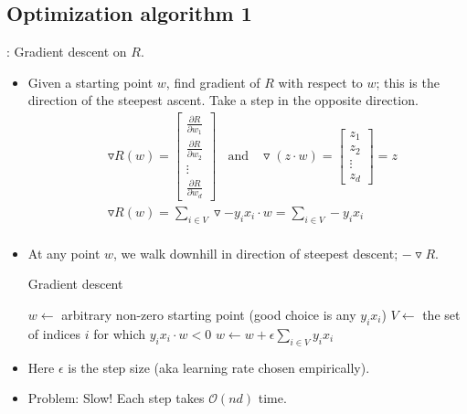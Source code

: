 \documentclass[10pt]{article}
\begin{document}
	\subsection{Optimization algorithm 1}: Gradient descent on $R$.
		\begin{itemize}
			\item Given a starting point $w$, find gradient of $R$ with respect to $w$; this is the direction of the steepest ascent. Take a step in the opposite direction.
				\begin{align*}
					& \triangledown R(w) =
						\begin{bmatrix}
 							\frac{\partial R}{\partial w_{1}}\\
 							\frac{\partial R}{\partial w_{2}} \\
 							\vdots \\
 							\frac{\partial R}{\partial w_{d}}
 						\end{bmatrix}
 					\ \ \ \ \text{and} \ \ \ \
 					\triangledown(z \cdot w) =
						\begin{bmatrix}
 							z_{1} \\
 							z_{2} \\
 							\vdots \\
 							z_{d}
 						\end{bmatrix} = z\\
 					& \triangledown R(w) = \sum_{i \in V} \triangledown -y_{i}x_{i} \cdot w = \sum_{i \in V} -y_{i}x_{i}\\
				\end{align*}
			\item At any point $w$, we walk downhill in direction of steepest descent; $- \triangledown R$.
			
			\begin{algorithm*}
			\caption{Gradient descent}
			\begin{algorithmic}
			\State $w \leftarrow$ arbitrary non-zero starting point (good choice is any $y_{i}x_{i}$)
			\While {R(w) $>$ 0}
			\State $V \leftarrow$ the set of indices $i$ for which $y_{i}x_{i} \cdot w < 0$
			\State $w \leftarrow w + \epsilon \sum_{i \in V} y_{i}x_{i}$
			\EndWhile
			\end{algorithmic}
			\end{algorithm*}

			\item Here $\epsilon$ is the step size (aka learning rate chosen empirically).
			
			\item Problem: Slow! Each step takes $\mathcal{O}(nd)$ time.
		\end{itemize}
	
\end{document}
